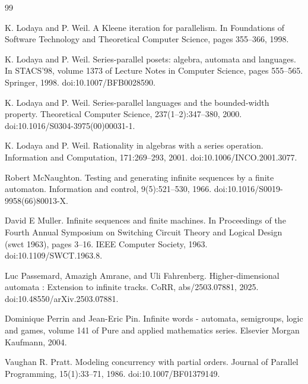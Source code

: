 \begin{thebibliography}{99}
\par\noindent    K. Lodaya and P. Weil.  A Kleene iteration for parallelism.  In Foundations of Software Technology and Theoretical Computer Science, pages 355–366, 1998.  

\par\noindent    K. Lodaya and P. Weil.  Series-parallel posets: algebra, automata and languages.  In STACS’98, volume 1373 of Lecture Notes in Computer Science, pages 555–565. Springer, 1998.  doi:10.1007/BFB0028590.  

\par\noindent    K. Lodaya and P. Weil.  Series-parallel languages and the bounded-width property.  Theoretical Computer Science, 237(1–2):347–380, 2000.  doi:10.1016/S0304-3975(00)00031-1.  

\par\noindent    K. Lodaya and P. Weil.  Rationality in algebras with a series operation.  Information and Computation, 171:269–293, 2001.  doi:10.1006/INCO.2001.3077.  

\par\noindent    Robert McNaughton.  Testing and generating infinite sequences by a finite automaton.  Information and control, 9(5):521–530, 1966.  doi:10.1016/S0019-9958(66)80013-X.  

\par\noindent    David E Muller.  Infinite sequences and finite machines.  In Proceedings of the Fourth Annual Symposium on Switching Circuit Theory and Logical Design (swct 1963), pages 3–16. IEEE Computer Society, 1963.  doi:10.1109/SWCT.1963.8.  

\par\noindent    Luc Passemard, Amazigh Amrane, and Uli Fahrenberg.  Higher-dimensional automata : Extension to infinite tracks.  CoRR, abs/2503.07881, 2025.  doi:10.48550/arXiv.2503.07881.  

\par\noindent    Dominique Perrin and Jean-Eric Pin.  Infinite words - automata, semigroups, logic and games, volume 141 of Pure and applied mathematics series.  Elsevier Morgan Kaufmann, 2004.  

\par\noindent    Vaughan R. Pratt.  Modeling concurrency with partial orders.  Journal of Parallel Programming, 15(1):33–71, 1986.  doi:10.1007/BF01379149.  


\end{thebibliography}
